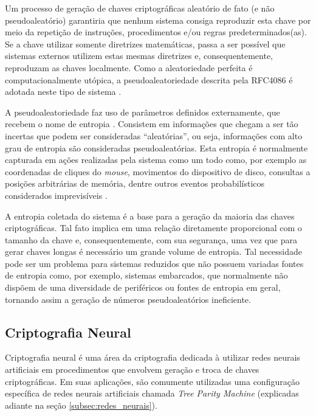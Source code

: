 \documentclass[a4paper,10pt,oneside,conference,final,keeplastbox]{inatel}
\begin{document}
            
            
            Um processo de geração de chaves criptográficas aleatório de fato (e não pseudoaleatório) garantiria que nenhum sistema consiga reproduzir esta chave por meio da repetição de instruções, procedimentos e/ou regras predeterminados(as). Se a chave utilizar somente diretrizes matemáticas, passa a ser possível que sistemas externos utilizem estas mesmas diretrizes e, consequentemente, reproduzam as chaves localmente. Como a aleatoriedade perfeita é computacionalmente utópica, a pseudoaleatoriedade descrita pela RFC4086 é adotada neste tipo de sistema \cite{ntwg2005rfc4086}.
            
            A pseudoaleatoriedade faz uso de parâmetros definidos externamente, que recebem o nome de entropia \cite{ristenpart2010randomness}. Consistem em informações que chegam a ser tão incertas que podem ser consideradas ``aleatórias'', ou seja, informações com alto grau de entropia são consideradas pseudoaleatórias. Esta entropia é normalmente capturada em ações realizadas pela sistema como um todo como, por exemplo as coordenadas de cliques do \textit{mouse}, movimentos do dispositivo de disco, consultas a posições arbitrárias de memória, dentre outros eventos probabilísticos considerados imprevisíveis \cite{young2004malicious}.
            
            A entropia coletada do sistema é a base para a geração da maioria das chaves criptográficas. Tal fato implica em uma relação diretamente proporcional com o tamanho da chave e, consequentemente, com sua segurança, uma vez que para gerar chaves longas é necessário um grande volume de entropia. Tal necessidade pode ser um problema para sistemas reduzidos que não possuem variadas fontes de entropia como, por exemplo, sistemas embarcados, que normalmente não dispõem de uma diversidade de periféricos ou fontes de entropia em geral, tornando assim a geração de números pseudoaleatórios ineficiente.
            
        \subsection{Criptografia Neural}
        \label{subsec:criptografia_neural}
        
            Criptografia neural é uma área da criptografia dedicada à utilizar redes neurais artificiais em procedimentos que envolvem geração e troca de chaves criptográficas. Em suas aplicações, são comumente utilizadas uma configuração específica de redes neurais artificiais chamada \textit{Tree Parity Machine} (explicadas adiante na seção \ref{subsec:redes_neurais}).
            
\end{document}
